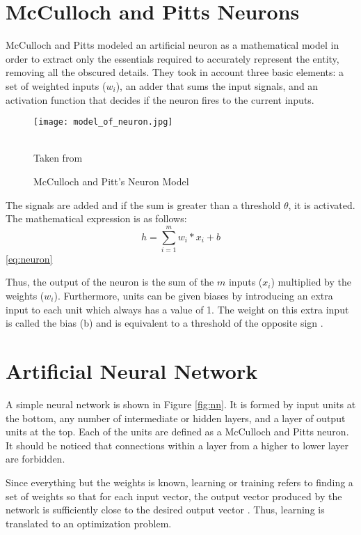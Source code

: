 \section{McCulloch and Pitts Neurons}
McCulloch and Pitts modeled an artificial neuron as a mathematical model in order to extract only the essentials required to accurately represent the entity, removing all the obscured details. They took in account three basic elements: a set of weighted inputs ($w_i$), an adder that sums the input signals, and an activation function that decides if the neuron fires to the current inputs.
\begin{figure}[h]
\centering
 
\texttt{[image: model\_of\_neuron.jpg]}
\caption{McCulloch and Pitt's Neuron Model}
\label{fig:neuron}
\begin{minipage}{12cm}
    \footnotesize
    \center
    \emph \\ Taken from \cite{marsland2015machine}
    \end{minipage}
\end{figure}

The signals are added and if the sum is greater than a threshold $\theta$, it is activated. The mathematical expression is as follows:\\
\begin{equation} \label{eq:neuron}
h=\sum_{i=1}^{m} w_i * x_i + b
\end{equation}\ref{eq:neuron}

Thus, the output of the neuron is the sum of the $m$ inputs ($x_i$) multiplied by the weights ($w_i$). Furthermore, units can be given biases by introducing an extra input to each unit which always has a value of 1. The weight on this extra input is called the bias (b) and is equivalent to a threshold of the opposite sign \cite{polk2002cognitive}. 


\section{Artificial Neural Network}

A simple neural network is shown in Figure \ref{fig:nn}. It is formed by input units at the bottom, any number of intermediate or hidden layers, and a layer of output units at the top. Each of the units are  defined as a McCulloch and Pitts neuron. It should be noticed that connections within a layer from a higher to lower layer are forbidden. 

Since everything but the weights is known, learning or training refers to finding a set of weights so that for each input vector, the output vector produced by the network is sufficiently close to the desired output vector \cite{polk2002cognitive}. Thus, learning is translated to an optimization problem.

